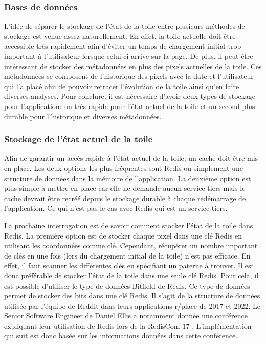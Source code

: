 \subsubsection{Bases de données}

L'idée de séparer le stockage de l'état de la toile entre plusieurs méthodes de stockage est venue assez naturellement. En effet, la toile actuelle doit être accessible très rapidement afin d'éviter un temps de chargement initial trop important à l'utilisateur lorsque celui-ci arrive sur la page. De plus, il peut être intéressant de stocker des métadonnées en plus des pixels actuelles de la toile. Ces métadonnées se composent de l'historique des pixels avec la date et l'utilisateur qui l'a placé afin de pouvoir retracer l'évolution de la toile ainsi qu'en faire diverses analyses. Pour conclure, il est nécessaire d'avoir deux types de stockage pour l'application: un très rapide pour l'état actuel de la toile et un second plus durable pour l'historique et diverses métadonnées.

\subsubsection{Stockage de l'état actuel de la toile}

Afin de garantir un accès rapide à l'état actuel de la toile, un cache doit être mis en place. Les deux options les plus fréquentes sont Redis ou simplement une structure de données dans la mémoire de l'application. La deuxième option est plus simple à mettre en place car elle ne demande aucun service tiers mais le cache devrait être recréé depuis le stockage durable à chaque redémarrage de l'application. Ce qui n'est pas le cas avec Redis qui est un service tiers.

La prochaine interrogation est de savoir comment stocker l'état de la toile dans Redis. La première option est de stocker chaque pixel dans une clé Redis en utilisant les coordonnées comme clé. Cependant, récupérer un nombre important de clés en une fois (lors du chargement initial de la toile) n'est pas efficace. En effet, il faut scanner les différentes clés en spécifiant un paterne à trouver. Il est donc préférable de stocker l'état de la toile dans une seule clé Redis. Pour cela, il est possible d'utiliser le type de données Bitfield \cite{bitfield} de Redis. Ce type de données permet de stocker des bits dans une clé Redis. Il s'agit de la structure de données utilisée par l'équipe de Reddit dans leurs applications r/place de 2017 et 2022. Le Senior Software Engineer de Daniel Ellis a notamment donnée une conférence expliquant leur utilisation de Redis lors de la RedisConf 17 \cite{redisconf}. L'implémentation qui suit est donc basée sur les informations données dans cette conférence.


